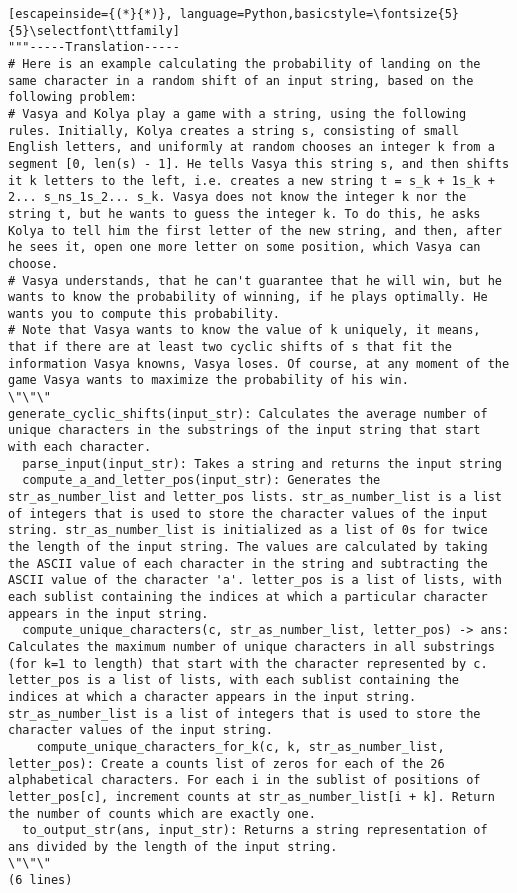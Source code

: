 \begin{figure*}[h] 
\begin{lstlisting}[escapeinside={(*}{*)}, language=Python,basicstyle=\fontsize{5}{5}\selectfont\ttfamily]
"""-----Translation-----
# Here is an example calculating the probability of landing on the same character in a random shift of an input string, based on the following problem:
# Vasya and Kolya play a game with a string, using the following rules. Initially, Kolya creates a string s, consisting of small English letters, and uniformly at random chooses an integer k from a segment [0, len(s) - 1]. He tells Vasya this string s, and then shifts it k letters to the left, i.e. creates a new string t = s_k + 1s_k + 2... s_ns_1s_2... s_k. Vasya does not know the integer k nor the string t, but he wants to guess the integer k. To do this, he asks Kolya to tell him the first letter of the new string, and then, after he sees it, open one more letter on some position, which Vasya can choose.
# Vasya understands, that he can't guarantee that he will win, but he wants to know the probability of winning, if he plays optimally. He wants you to compute this probability.
# Note that Vasya wants to know the value of k uniquely, it means, that if there are at least two cyclic shifts of s that fit the information Vasya knowns, Vasya loses. Of course, at any moment of the game Vasya wants to maximize the probability of his win.
\"\"\"
generate_cyclic_shifts(input_str): Calculates the average number of unique characters in the substrings of the input string that start with each character.
  parse_input(input_str): Takes a string and returns the input string
  compute_a_and_letter_pos(input_str): Generates the str_as_number_list and letter_pos lists. str_as_number_list is a list of integers that is used to store the character values of the input string. str_as_number_list is initialized as a list of 0s for twice the length of the input string. The values are calculated by taking the ASCII value of each character in the string and subtracting the ASCII value of the character 'a'. letter_pos is a list of lists, with each sublist containing the indices at which a particular character appears in the input string.
  compute_unique_characters(c, str_as_number_list, letter_pos) -> ans: Calculates the maximum number of unique characters in all substrings (for k=1 to length) that start with the character represented by c. letter_pos is a list of lists, with each sublist containing the indices at which a character appears in the input string. str_as_number_list is a list of integers that is used to store the character values of the input string.
    compute_unique_characters_for_k(c, k, str_as_number_list, letter_pos): Create a counts list of zeros for each of the 26 alphabetical characters. For each i in the sublist of positions of letter_pos[c], increment counts at str_as_number_list[i + k]. Return the number of counts which are exactly one.
  to_output_str(ans, input_str): Returns a string representation of ans divided by the length of the input string.
\"\"\"
(6 lines)


\end{lstlisting}
\end{figure*}
